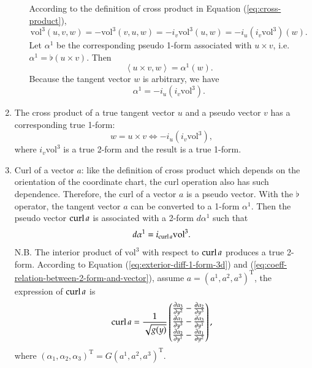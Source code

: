 \documentclass[11pt, a4paper]{book}
\begin{document}
\begin{enumerate}
\begin{itemize}
    \begin{Proof}
      According to the definition of cross product in Equation (\ref{eq:cross-product}),
      \begin{equation*}
        \mathrm{vol}^3(u,v,w) = -\mathrm{vol}^3(v,u,w) = -i_v \mathrm{vol}^3(u,w) =
        -i_u(i_v \mathrm{vol}^3)(w).
      \end{equation*}
      Let $\alpha^1$ be the corresponding pseudo 1-form associated with $u\times v$, i.e.
      $\alpha^1 = \flat(u\times v)$. Then
      \begin{equation*}
        \left\langle u\times v, w \right\rangle = \alpha^1(w).
      \end{equation*}
      Because the tangent vector $w$ is arbitrary, we have
      \begin{equation*}
        \alpha^1 = -i_u(i_v \mathrm{vol}^3).
      \end{equation*}
    \end{Proof}
  \end{itemize}
\item The cross product of a true tangent vector $u$ and a pseudo vector $v$ has a
  corresponding true 1-form:
  \begin{equation}
    w = u \times v \Longleftrightarrow -i_u(i_v \mathrm{vol}^3),
  \end{equation}
  where $i_v \mathrm{vol}^3$ is a true 2-form and the result is a true 1-form.
\item Curl of a vector $a$: like the definition of cross product which depends on the
  orientation of the coordinate chart, the curl operation also has such dependence.
  Therefore, the curl of a vector $a$ is a pseudo vector. With the $\flat$ operator, the
  tangent vector $a$ can be converted to a 1-form $\alpha^1$. Then the pseudo vector
  $\operatorname{curl} a$ is associated with a 2-form $d\alpha^1$ such that
  \begin{equation}
    d\alpha^1 = i_{\operatorname{curl} a} \mathrm{vol}^3.
  \end{equation}
  N.B. The interior product of $\mathrm{vol}^3$ with respect to $\operatorname{curl} a$ produces a true
  2-form. According to Equation (\ref{eq:exterior-diff-1-form-3d}) and
  (\ref{eq:coeff-relation-between-2-form-and-vector}), assume
  $a = (a^1,a^2,a^3)^{\mathrm{T}}$, the expression of $\operatorname{curl} a$ is
  \begin{equation}
    \label{eq:curl-expr-general}
    \operatorname{curl} a = \frac{1}{\sqrt{g(y)}} \begin{pmatrix}
      \frac{\partial \alpha_3}{\partial y^2} - \frac{\partial \alpha_2}{\partial y^3} \\
      \frac{\partial \alpha_1}{\partial y^3} - \frac{\partial \alpha_3}{\partial y^1} \\
      \frac{\partial \alpha_2}{\partial y^1} - \frac{\partial \alpha_1}{\partial y^2}
    \end{pmatrix},
  \end{equation}
  where $(\alpha_1,\alpha_2,\alpha_3)^{\mathrm{T}} = G (a^1,a^2,a^3)^{\mathrm{T}}$.


\end{enumerate}
\end{document}
